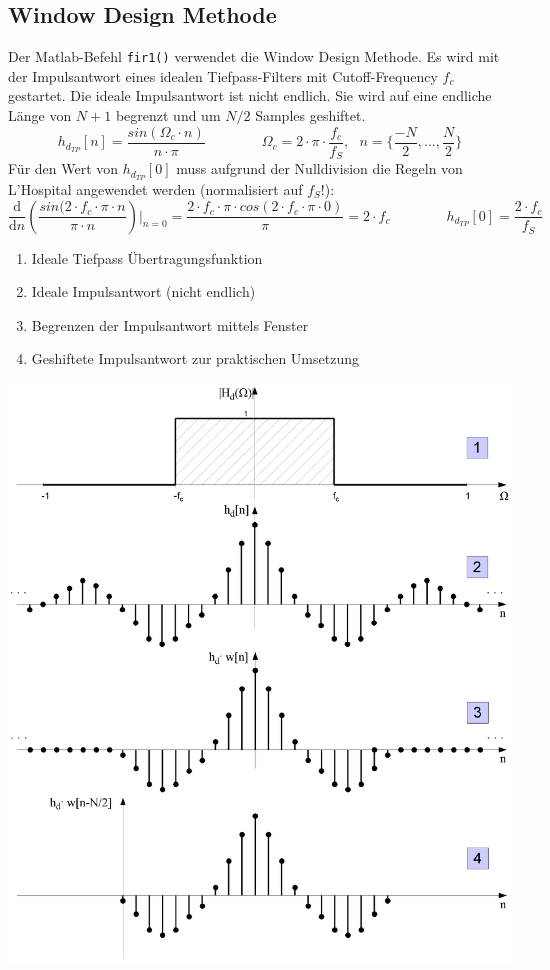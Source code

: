 \subsection{Window Design Methode}
Der Matlab-Befehl \verb|fir1()| verwendet die Window Design Methode. Es wird mit 
der Impulsantwort eines idealen Tiefpass-Filters mit Cutoff-Frequency $f_c$ gestartet. 
Die ideale Impulsantwort ist nicht endlich. Sie wird auf eine endliche Länge von $N+1$ 
begrenzt und um $N/2$ Samples geshiftet. 
\[ h_{d_{TP}}[n]= \frac{sin(\Omega_c \cdot n)}{n \cdot \pi} \qquad \qquad
			\Omega_c = 2 \cdot \pi \cdot \frac{f_c}{f_S}, \text{ }n = \bigg\{\frac{-N}{2},...,\frac{N}{2} \bigg\} \]
Für den Wert von $h_{d_{TP}}[0]$ muss aufgrund der Nulldivision die Regeln von L'Hospital angewendet werden (normalisiert auf $f_S$!):
\[ 
	\frac{\text{d}}{\text{d}n}  \left( \frac{ sin(2\cdot f_c \cdot \pi \cdot n} {\pi \cdot n} \right)\bigg|_{n=0}= 
	\frac{2\cdot f_c \cdot \pi \cdot cos(2\cdot f_c \cdot \pi \cdot 0)}{\pi} = 2 \cdot f_c \qquad \qquad h_{d_{TP}}[0]= \frac{2 \cdot f_c}{f_S}
\]
\begin{enumerate}[noitemsep,topsep=3pt]
	\item Ideale Tiefpass Übertragungsfunktion
	\item Ideale Impulsantwort (nicht endlich)
	\item Begrenzen der Impulsantwort mittels Fenster
	\item Geshiftete Impulsantwort zur praktischen Umsetzung
\end{enumerate}
\begin{center}
	\includegraphics[width=.625\textwidth]{../fig/window_design_methode}
\end{center}
